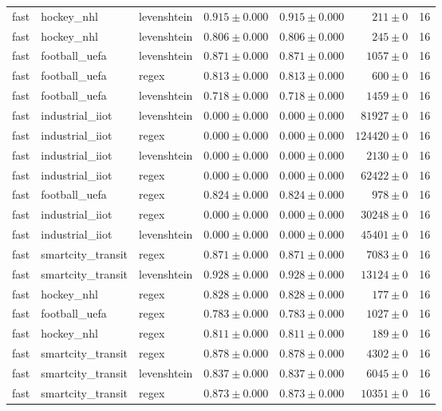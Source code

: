 \begin{table}[htbp]
\begin{tabular}{l l l r r r r}
fast & hockey\_nhl & levenshtein & $0.915\pm0.000$ & $0.915\pm0.000$ & $211\pm0$ & 16 \\
fast & hockey\_nhl & levenshtein & $0.806\pm0.000$ & $0.806\pm0.000$ & $245\pm0$ & 16 \\
fast & football\_uefa & levenshtein & $0.871\pm0.000$ & $0.871\pm0.000$ & $1057\pm0$ & 16 \\
fast & football\_uefa & regex & $0.813\pm0.000$ & $0.813\pm0.000$ & $600\pm0$ & 16 \\
fast & football\_uefa & levenshtein & $0.718\pm0.000$ & $0.718\pm0.000$ & $1459\pm0$ & 16 \\
fast & industrial\_iiot & levenshtein & $0.000\pm0.000$ & $0.000\pm0.000$ & $81927\pm0$ & 16 \\
fast & industrial\_iiot & regex & $0.000\pm0.000$ & $0.000\pm0.000$ & $124420\pm0$ & 16 \\
fast & industrial\_iiot & levenshtein & $0.000\pm0.000$ & $0.000\pm0.000$ & $2130\pm0$ & 16 \\
fast & industrial\_iiot & regex & $0.000\pm0.000$ & $0.000\pm0.000$ & $62422\pm0$ & 16 \\
fast & football\_uefa & regex & $0.824\pm0.000$ & $0.824\pm0.000$ & $978\pm0$ & 16 \\
fast & industrial\_iiot & regex & $0.000\pm0.000$ & $0.000\pm0.000$ & $30248\pm0$ & 16 \\
fast & industrial\_iiot & levenshtein & $0.000\pm0.000$ & $0.000\pm0.000$ & $45401\pm0$ & 16 \\
fast & smartcity\_transit & regex & $0.871\pm0.000$ & $0.871\pm0.000$ & $7083\pm0$ & 16 \\
fast & smartcity\_transit & levenshtein & $0.928\pm0.000$ & $0.928\pm0.000$ & $13124\pm0$ & 16 \\
fast & hockey\_nhl & regex & $0.828\pm0.000$ & $0.828\pm0.000$ & $177\pm0$ & 16 \\
fast & football\_uefa & regex & $0.783\pm0.000$ & $0.783\pm0.000$ & $1027\pm0$ & 16 \\
fast & hockey\_nhl & regex & $0.811\pm0.000$ & $0.811\pm0.000$ & $189\pm0$ & 16 \\
fast & smartcity\_transit & regex & $0.878\pm0.000$ & $0.878\pm0.000$ & $4302\pm0$ & 16 \\
fast & smartcity\_transit & levenshtein & $0.837\pm0.000$ & $0.837\pm0.000$ & $6045\pm0$ & 16 \\
fast & smartcity\_transit & regex & $0.873\pm0.000$ & $0.873\pm0.000$ & $10351\pm0$ & 16 \\

\end{tabular}
\end{table}
